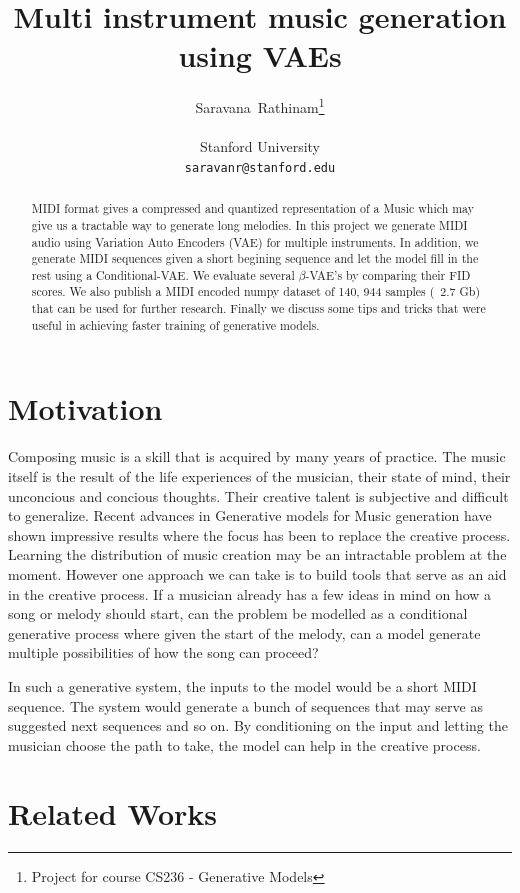 \documentclass{article}
\title{Multi instrument music generation using VAEs}
\author{%
  Saravana~Rathinam\thanks{Project for course CS236 - Generative Models} \\
  \\
  Stanford University\\
  \texttt{saravanr@stanford.edu} \\
}
\begin{document}
\maketitle


\begin{abstract}
MIDI format gives a compressed and quantized representation of
a Music which may give us a tractable way to generate long melodies. In this project we generate MIDI audio using Variation Auto Encoders (VAE) for multiple instruments. In addition, we generate MIDI sequences given a short begining sequence and let the model fill in the rest using a Conditional-VAE. We evaluate several $\beta$-VAE's by comparing their FID scores. We also publish a MIDI encoded numpy dataset of 140, 944 samples (~2.7 Gb) that can be used for further research. Finally we discuss some tips and tricks that were useful in achieving faster training of generative models.
\end{abstract}
\section{Motivation}
\label{submission}
Composing music is a skill that is acquired by many years of practice. The music itself is the result of the life experiences of the musician, their state of mind, their unconcious and concious thoughts. Their creative talent is subjective and difficult to generalize. Recent advances in Generative models for Music generation have shown impressive results where the focus has been to replace the creative process. Learning the distribution of music creation may be an intractable problem at the moment. However one approach we can take is to build tools that serve as an aid in the creative process.  If a musician already has a few ideas in mind on how a song or melody should start, can the problem be modelled as a conditional generative process where given the start of the melody, can a model generate multiple possibilities of how the song can proceed? 

In such a generative system, the inputs to the model would be a short MIDI sequence. The system would generate a bunch of sequences that may serve as suggested next sequences and so on. By conditioning on the input and letting the musician choose the path to take, the model can help in the creative process.

\section{Related Works}
\end{document}
